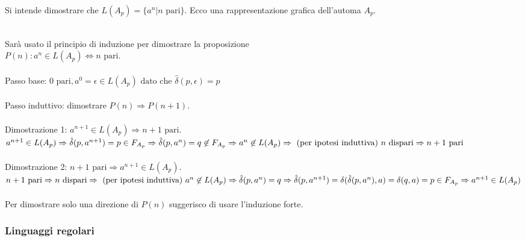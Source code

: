 \documentclass[]{article}
\begin{document}
\newpage
Si intende dimostrare che
\mbox{$ L(A_p) = \{ a^n | n \text{ pari} \} $}. Ecco una
rappresentazione grafica dell'automa \mbox{$A_p$}.
\\
\\
Sarà usato il principio di induzione per dimostrare la proposizione
\\
\mbox{$ P(n) \colon a^n \in L(A_p) \Leftrightarrow n \text{ pari} $}.
\\
\\
Passo base: \mbox{$ 0 \text{ pari}, a^0 = \epsilon \in L(A_p)
\text{ dato che }
\hat\delta(p, \epsilon) = p$}
\\
\\
Passo induttivo: dimostrare \mbox{$ P(n) \Rightarrow P(n + 1) $}.
\\
\\
Dimostrazione 1: \mbox{$ a^{n + 1} \in L(A_p) \Rightarrow n + 1 \text{ pari} $}.
\\
\begin{math}
a^{n + 1} \in L(A_p)
\Rightarrow \hat\delta(p, a^{n + 1}) = p \in F_{A_p}
\Rightarrow \hat\delta(p, a^n) = q \not\in F_{A_p}
\Rightarrow a^n \not\in L(A_p) \\
\Rightarrow \text{ (per ipotesi induttiva) } n \text{ dispari}
\Rightarrow n + 1 \text{ pari}
\end{math}
\\
\\
Dimostrazione 2: \mbox{$ n + 1 \text{ pari} \Rightarrow a^{n + 1} \in L(A_p) $}.
\\
\begin{math}
n + 1 \text{ pari}
\Rightarrow n \text{ dispari} \\
\Rightarrow \text{ (per ipotesi induttiva) } a^n \not\in L(A_p)
\Rightarrow \hat\delta(p, a^n) = q \\
\Rightarrow \hat\delta(p, a^{n + 1}) = \delta(\hat\delta(p, a^n), a) = \delta(q, a) = p \in F_{A_p}
\Rightarrow a^{n + 1} \in L(A_p)
\end{math}
\\
\\
Per dimostrare solo una direzione di \mbox{$ P(n) $} suggerisco di usare
l'induzione forte.


\newpage
\subsubsection{Linguaggi regolari}
\end{document}
